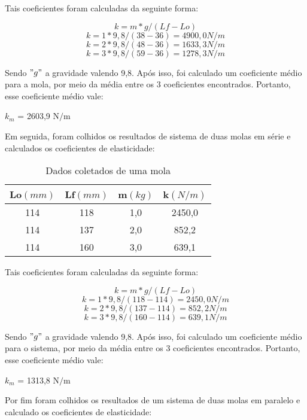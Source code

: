 \documentclass[
	12pt,				%
	oneside,			%
	a4paper,			%
	english,			%
	french,				%
	spanish,			%
	brazil,				%
	]{abntex2}
\begin{document}
Tais coeficientes foram calculadas da seguinte forma:

\[
k = m*g/(Lf - Lo)
\]
\[
k = 1*9,8/(38 - 36) = 4900,0 N/m 
\]
\[
k = 2*9,8/(48 - 36) = 1633,3 N/m 
\]
\[
k = 3*9,8/(59 - 36) = 1278,3 N/m
\]

Sendo $"g"$ a gravidade valendo 9,8. Após isso, foi calculado um coeficiente médio para a mola, por meio da média entre os 3 coeficientes encontrados. Portanto, esse coeficiente médio vale:

\begin{center}
$k_{m}$ = 2603,9 N$/$m
\end{center}

Em seguida, foram colhidos os resultados de sistema de duas molas em série e calculados os coeficientes de elasticidade:

\begin{center}
\begin{table}[H]
\caption{Dados coletados de uma mola}
\begin{center}
\begin{tabular}{c|c|c|c}

\hline
Lo$(mm)$ & Lf$(mm)$ & m$(kg)$ & k$(N/m)$ \\ 
\hline
114 & 118 & 1,0 & 2450,0 \\
\hline
114 & 137 & 2,0 & 852,2 \\
\hline
114 & 160 & 3,0 & 639,1 \\


\end{tabular}
\end{center}
\end{table}
\end{center}

Tais coeficientes foram calculadas da seguinte forma:

\[
k = m*g/(Lf - Lo)
\]
\[
k = 1*9,8/(118 - 114) = 2450,0 N/m 
\]
\[
k = 2*9,8/(137 - 114) = 852,2 N/m 
\]
\[
k = 3*9,8/(160 - 114) = 639,1 N/m
\]

Sendo $"g"$ a gravidade valendo 9,8. Após isso, foi calculado um coeficiente médio para o sistema, por meio da média entre os 3 coeficientes encontrados. Portanto, esse coeficiente médio vale:

\begin{center}
$k_{m}$ = 1313,8 N$/$m
\end{center}

Por fim foram colhidos os resultados de um sistema de duas molas em paralelo e calculado os coeficientes de elasticidade:
\end{document}
